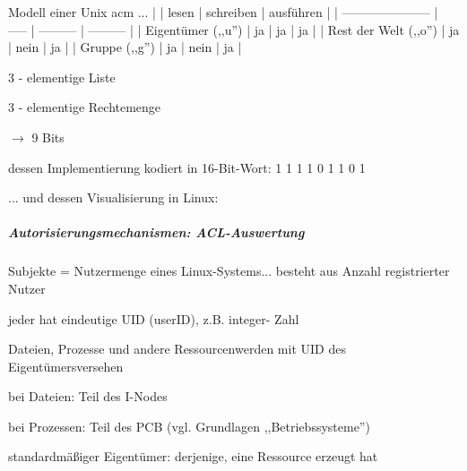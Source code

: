 \documentclass[a4paper]{article}
\begin{document}
\begin{multicols}{3}
    Modell einer Unix acm ... | | lesen |
    schreiben | ausführen | |
    --------------------- |
    ----- | --------- |
    --------- | | Eigentümer (,,u'')
    | ja | ja | ja | | Rest der
    Welt (,,o'') | ja | nein | ja |
    | Gruppe (,,g'') | ja | nein | ja
    |

    \begin{itemize*}
        \item
        3 - elementige Liste
        \item
        3 - elementige Rechtemenge
        \item
        $\rightarrow$ 9 Bits
        \item
        dessen Implementierung kodiert in 16-Bit-Wort: 1 1 1 1 0 1 1 0 1
        \item
        ... und dessen Visualisierung in Linux:
    \end{itemize*}



    \subparagraph{Autorisierungsmechanismen:
        ACL-Auswertung}

    Subjekte = Nutzermenge eines Linux-Systems... besteht aus Anzahl
    registrierter Nutzer

    \begin{itemize*}
        \item
        jeder hat eindeutige UID (userID), z.B. integer- Zahl
        \item
        Dateien, Prozesse und andere Ressourcenwerden mit UID des
        Eigentümersversehen
        \begin{itemize*}
            \item bei Dateien: Teil des I-Nodes
            \item bei Prozessen: Teil des PCB (vgl. Grundlagen ,,Betriebssysteme'')
            \item standardmäßiger Eigentümer: derjenige, eine Ressource erzeugt hat
        \end{itemize*}
    \end{itemize*}


\end{multicols}
\end{document}

